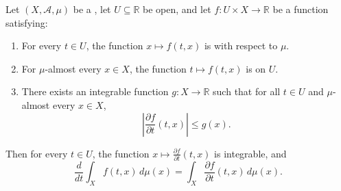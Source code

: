 \begin{theorem} \label{theorem:leibniz_rule_for_differentiation_under_the_integral}
    Let $(X, \mathcal{A}, \mu)$ be a , let $U \subseteq \mathbb{R}$ be open, and let $f : U \times X \to \mathbb{R}$ be a function satisfying:

    \begin{enumerate}
        \item For every $t \in U$, the function $x \mapsto f(t, x)$ is  with respect to $\mu$.
        \item For $\mu$-almost every $x \in X$, the function $t \mapsto f(t, x)$ is  on $U$.
        \item There exists an integrable function $g : X \to \mathbb{R}$ such that for all $t \in U$ and $\mu$-almost every $x \in X$,
        $$\left| \frac{\partial f}{\partial t}(t, x) \right| \le g(x).$$
    \end{enumerate}

    Then for every $t \in U$, the function $x \mapsto \frac{\partial f}{\partial t}(t, x)$ is integrable, and
    $$\frac{d}{dt} \int_X f(t, x) \, d\mu(x) = \int_X \frac{\partial f}{\partial t}(t, x) \, d\mu(x).$$
\end{theorem}

